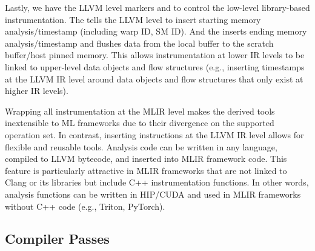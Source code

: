 
Lastly, we have the LLVM level markers  and  to control the low-level library-based instrumentation.
The  tells the LLVM level to insert starting memory analysis/timestamp (including warp ID, SM ID).
And the  inserts ending memory analysis/timestamp and flushes data from the local buffer to the scratch buffer/host pinned memory. This allows instrumentation at lower IR levels to be linked to upper-level data objects and flow structures (e.g., inserting timestamps at the LLVM IR level around data objects and flow structures that only exist at higher IR levels). 


Wrapping all instrumentation at the MLIR level makes the derived tools inextensible to ML frameworks due to their divergence on the supported operation set.
In contrast, inserting instructions at the LLVM IR level allows for flexible and reusable tools. 
Analysis code can be written in any language, compiled to LLVM bytecode, and inserted into MLIR framework code. 
This feature is particularly attractive in MLIR frameworks that are not linked to Clang or its libraries but include C++ instrumentation functions.
In other words, analysis functions can be written in HIP/CUDA and used in MLIR frameworks without C++ code (e.g., Triton, PyTorch).

\subsection{Compiler Passes}

